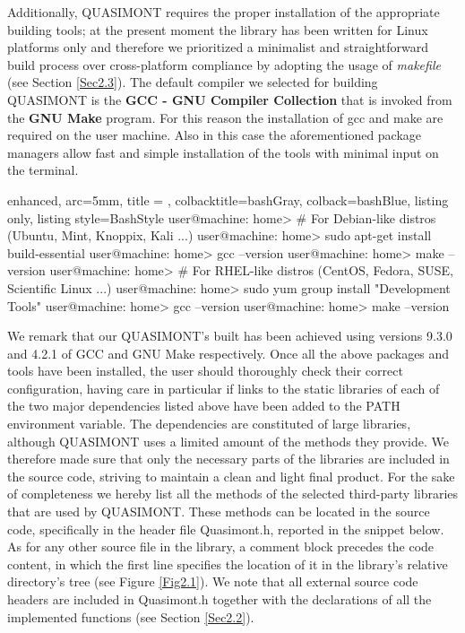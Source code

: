\documentclass[a4paper, twosided]{book}
\begin{document}
\noindent
Additionally, QUASIMONT requires the proper installation of the appropriate building tools; at the present moment the library has been written for Linux platforms only and therefore we prioritized a minimalist and straightforward build process over cross-platform compliance by adopting the usage of {\itshape makefile} (see Section \ref{Sec2.3}). The default compiler we selected for building QUASIMONT is the \color{poliDarkBlue} \textbf{GCC - GNU Compiler Collection} \color{black} \cite{gcc} that is invoked from the \color{poliDarkBlue} \textbf{GNU Make} \color{black} \cite{make} program. For this reason the installation of \colorbox{poliGrayBlue}{gcc} and \colorbox{poliGrayBlue}{make} are required on the user machine. Also in this case the aforementioned package managers allow fast and simple installation of the tools with minimal input on the terminal.

\vspace{0.5cm}
\begin{tcblisting}{enhanced,
                   arc=5mm,
                   title = \color{black}{\large \ttfamily Installation of building tools},
                   colbacktitle=bashGray,
                   colback=bashBlue,
                   listing only,
                   listing style=BashStyle}
user@machine: home> # For Debian-like distros (Ubuntu, Mint, Knoppix, Kali ...)
user@machine: home> sudo apt-get install build-essential
user@machine: home> gcc --version
user@machine: home> make --version
user@machine: home> # For RHEL-like distros (CentOS, Fedora, SUSE, Scientific Linux ...)
user@machine: home> sudo yum group install "Development Tools"
user@machine: home> gcc --version
user@machine: home> make --version
\end{tcblisting}
\vspace{0.5cm}

\noindent
We remark that our QUASIMONT's built has been achieved using versions \colorbox{poliGrayBlue}{9.3.0} and \colorbox{poliGrayBlue}{4.2.1} of GCC and GNU Make respectively. Once all the above packages and tools have been installed, the user should thoroughly check their correct configuration, having care in particular if links to the static libraries of each of the two major dependencies listed above have been added to the \colorbox{poliGrayBlue}{PATH} environment variable. The dependencies are constituted of large libraries, although QUASIMONT uses a limited amount of the methods they provide. We therefore made sure that only the necessary parts of the libraries are included in the source code, striving to maintain a clean and light final product. For the sake of completeness we hereby list all the methods of the selected third-party libraries  that are used by QUASIMONT.  These methods can be located in the source code, specifically in the header file \colorbox{poliGrayBlue}{Quasimont.h}, reported in the snippet below. As for any other source file in the library, a comment block precedes the code content, in which the first line specifies the location of it in the library's relative directory's tree (see Figure \ref{Fig2.1}).
We note that all external source code headers are included in \colorbox{poliGrayBlue}{Quasimont.h} together with the declarations of all the implemented functions (see Section \ref{Sec2.2}).
\end{document}
